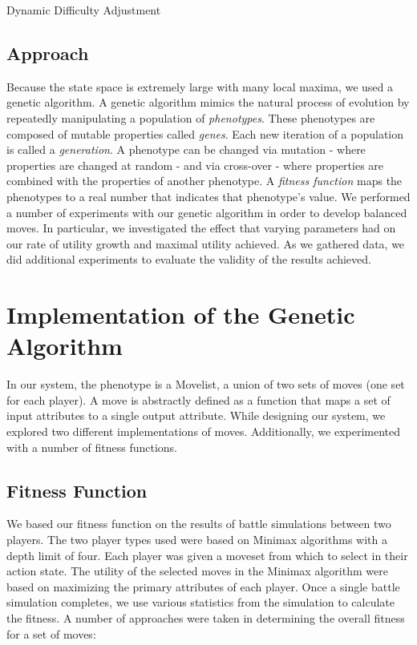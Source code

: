 \documentclass{acm_proc_article-sp}
\begin{document}
Dynamic Difficulty Adjustment

\subsection{Approach}

Because the state space is extremely large with many local maxima, we used a genetic algorithm. A genetic algorithm mimics the natural process of evolution by repeatedly manipulating a population of \textit{phenotypes}. These phenotypes are composed of mutable properties called \textit{genes}. Each new iteration of a population is called a \textit{generation}. A phenotype can be changed via mutation - where properties are changed at random - and via cross-over - where properties are combined with the properties of another phenotype. A \textit{fitness function} maps the phenotypes to a real number that indicates that phenotype’s value. 
We performed a number of experiments with our genetic algorithm in order to develop balanced moves. In particular, we investigated the effect that varying parameters had on our rate of utility growth and maximal utility achieved. As we gathered data, we did additional experiments to evaluate the validity of the results achieved.

\section{Implementation of the Genetic Algorithm}

In our system, the phenotype is a Movelist, a union of two sets of moves (one set for each player). A move is abstractly defined as a function that maps a set of input attributes to a single output attribute. While designing our system, we explored two different implementations of moves. Additionally, we experimented with a number of fitness functions.

\subsection{Fitness Function}

We based our fitness function on the results of battle simulations between two players.  The two player types used were based on Minimax algorithms with a depth limit of four. Each player was given a moveset from which to select in their action state. The utility of the selected moves in the Minimax algorithm were based on maximizing the primary attributes of each player.
Once a single battle simulation completes, we use various statistics from the simulation to calculate the fitness. A number of approaches were taken in determining the overall fitness for a set of moves:
\end{document}
